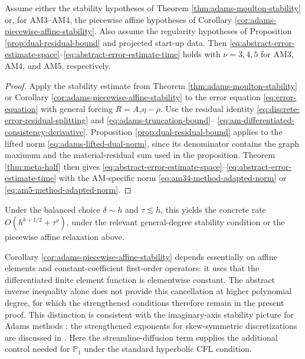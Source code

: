 \documentclass[11pt]{article}
\begin{document}
\begin{cor}
\label{cor:adams-moulton-error}
Assume either the stability hypotheses of Theorem
\ref{thm:adams-moulton-stability} or, for AM3--AM4, the piecewise affine
hypotheses of Corollary \ref{cor:adams-piecewise-affine-stability}. Also
assume the regularity hypotheses of Proposition
\ref{prop:dual-residual-bound} and projected start-up data. Then
\eqref{eq:abstract-error-estimate-space}--\eqref{eq:abstract-error-estimate-time}
holds with \(\nu=3,4,5\) for AM3, AM4, and AM5, respectively.
\end{cor}
\begin{proof}
Apply the stability estimate from Theorem
\ref{thm:adams-moulton-stability} or Corollary
\ref{cor:adams-piecewise-affine-stability} to the error equation
\eqref{eq:error-equation} with general forcing
\(R=A_{\tau}\eta-\rho\). Use the residual identity
\eqref{eq:discrete-error-residual-splitting} and
\eqref{eq:adams-truncation-bound}--
\eqref{eq:am-differentiated-consistency-derivative}. Proposition
\ref{prop:dual-residual-bound} applies to the lifted norm
\eqref{eq:adams-lifted-dual-norm}, since its denominator contains the graph
maximum and the material-residual sum used in the proposition. Theorem
\ref{thm:meta-half} then gives
\eqref{eq:abstract-error-estimate-space}--\eqref{eq:abstract-error-estimate-time}
with the AM-specific norm \eqref{eq:am34-method-adapted-norm} or
\eqref{eq:am5-method-adapted-norm}.
\end{proof}
Under the balanced choice \(\delta\sim h\) and \(\tau\lesssim h\), this yields
the concrete rate \(O(h^{k+1/2}+\tau^\nu)\), under the relevant general-degree
stability condition or the piecewise affine relaxation above.

\begin{rem}
\label{rem:adams-piecewise-affine-relaxation}
Corollary \ref{cor:adams-piecewise-affine-stability} depends essentially on
affine elements and constant-coefficient first-order operators: it uses that
the differentiated finite element function is elementwise constant.
The abstract inverse inequality alone does not provide this cancellation at
higher polynomial degree, for which the strengthened conditions therefore
remain in the present proof. This distinction is consistent with the
imaginary-axis stability picture for Adams methods \cite{GFR15}; the
strengthened exponents for skew-symmetric discretizations are discussed in
\cite{Der12}. Here the
streamline-diffusion term supplies the additional control needed for
\(\mathbb P_1\) under the standard hyperbolic CFL condition.
\end{rem}
\end{document}
